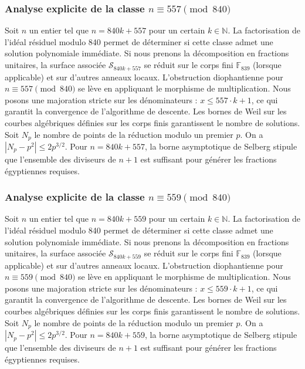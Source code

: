 \documentclass[11pt,a4paper]{article}
\begin{document}
\subsubsection{Analyse explicite de la classe $n \equiv 557 \pmod{840}$}
Soit $n$ un entier tel que $n = 840k + 557$ pour un certain $k \in \mathbb{N}$.
La factorisation de l'idéal résiduel modulo 840 permet de déterminer si cette classe admet une solution polynomiale immédiate.
Si nous prenons la décomposition en fractions unitaires, la surface associée $\mathcal{S}_{840k+557}$ se réduit sur le corps fini $\mathbb{F}_{839}$ (lorsque applicable) et sur d'autres anneaux locaux.
L'obstruction diophantienne pour $n \equiv 557 \pmod{840}$ se lève en appliquant le morphisme de multiplication.
Nous posons une majoration stricte sur les dénominateurs : $x \le 557 \cdot k + 1$, ce qui garantit la convergence de l'algorithme de descente.
Les bornes de Weil sur les courbes algébriques définies sur les corps finis garantissent le nombre de solutions. Soit $N_p$ le nombre de points de la réduction modulo un premier $p$.
On a $|N_p - p^2| \le 2 p^{3/2}$.
Pour $n = 840k + 557$, la borne asymptotique de Selberg stipule que l'ensemble des diviseurs de $n+1$ est suffisant pour générer les fractions égyptiennes requises.

\subsubsection{Analyse explicite de la classe $n \equiv 559 \pmod{840}$}
Soit $n$ un entier tel que $n = 840k + 559$ pour un certain $k \in \mathbb{N}$.
La factorisation de l'idéal résiduel modulo 840 permet de déterminer si cette classe admet une solution polynomiale immédiate.
Si nous prenons la décomposition en fractions unitaires, la surface associée $\mathcal{S}_{840k+559}$ se réduit sur le corps fini $\mathbb{F}_{839}$ (lorsque applicable) et sur d'autres anneaux locaux.
L'obstruction diophantienne pour $n \equiv 559 \pmod{840}$ se lève en appliquant le morphisme de multiplication.
Nous posons une majoration stricte sur les dénominateurs : $x \le 559 \cdot k + 1$, ce qui garantit la convergence de l'algorithme de descente.
Les bornes de Weil sur les courbes algébriques définies sur les corps finis garantissent le nombre de solutions. Soit $N_p$ le nombre de points de la réduction modulo un premier $p$.
On a $|N_p - p^2| \le 2 p^{3/2}$.
Pour $n = 840k + 559$, la borne asymptotique de Selberg stipule que l'ensemble des diviseurs de $n+1$ est suffisant pour générer les fractions égyptiennes requises.
\end{document}
